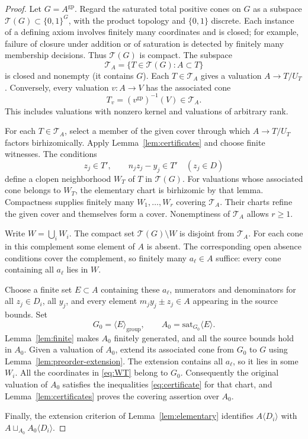 \documentclass[11pt]{article}
\theoremstyle{definition}
\theoremstyle{remark}
\newcommand{\gp}{\mathrm{gp}}
\newcommand{\sat}{\mathrm{sat}}
\newcommand{\cT}{\mathcal T}
\begin{document}
\begin{proof}
Let $G=A^{\gp}$. Regard the saturated total positive cones on $G$ as a subspace $\cT(G)\subset\{0,1\}^G$, with the product topology and $\{0,1\}$ discrete. Each instance of a defining axiom involves finitely many coordinates and is closed; for example, failure of closure under addition or of saturation is detected by finitely many membership decisions. Thus $\cT(G)$ is compact. The subspace
\[
 \cT_A=\{T\in\cT(G):A\subset T\}
\]
is closed and nonempty (it contains $G$). Each $T\in\cT_A$ gives a valuation $A\to T/U_T$. Conversely, every valuation $v:A\to V$ has the associated cone
\[
 T_v=(v^{\gp})^{-1}(V)\in\cT_A.
\]
This includes valuations with nonzero kernel and valuations of arbitrary rank.

For each $T\in\cT_A$, select a member of the given cover through which $A\to T/U_T$ factors birhizomically. Apply Lemma~\ref{lem:certificates} and choose finite witnesses. The conditions
\begin{equation}\label{eq:WT}
 z_j\in T',\qquad n_jz_j-y_j\in T'
 \quad(z_j\in D)
\end{equation}
define a clopen neighborhood $W_T$ of $T$ in $\cT(G)$. For valuations whose associated cone belongs to $W_T$, the elementary chart is birhizomic by that lemma. Compactness supplies finitely many $W_1,\ldots,W_r$ covering $\cT_A$. Their charts refine the given cover and themselves form a cover. Nonemptiness of $\cT_A$ allows $r\geq1$.

Write $W=\bigcup_iW_i$. The compact set $\cT(G)\setminus W$ is disjoint from $\cT_A$. For each cone in this complement some element of $A$ is absent. The corresponding open absence conditions cover the complement, so finitely many $a_\ell\in A$ suffice: every cone containing all $a_\ell$ lies in $W$.

Choose a finite set $E\subset A$ containing these $a_\ell$, numerators and denominators for all $z_j\in D_i$, all $y_j$, and every element $m_jy_j\pm z_j\in A$ appearing in the source bounds. Set
\[
 G_0=\langle E\rangle_{\mathrm{group}},\qquad
 A_0=\sat_{G_0}\langle E\rangle.
\]
Lemma~\ref{lem:finite} makes $A_0$ finitely generated, and all the source bounds hold in $A_0$. Given a valuation of $A_0$, extend its associated cone from $G_0$ to $G$ using Lemma~\ref{lem:preorder-extension}. The extension contains all $a_\ell$, so it lies in some $W_i$. All the coordinates in \eqref{eq:WT} belong to $G_0$. Consequently the original valuation of $A_0$ satisfies the inequalities \eqref{eq:certificate} for that chart, and Lemma~\ref{lem:certificates} proves the covering assertion over $A_0$.

Finally, the extension criterion of Lemma~\ref{lem:elementary} identifies $A\langle D_i\rangle$ with $A\sqcup_{A_0}A_0\langle D_i\rangle$.
\end{proof}
\end{document}
